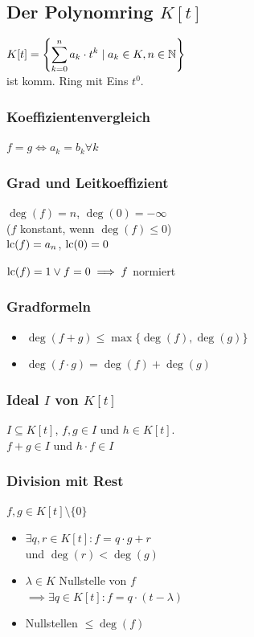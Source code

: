 \subsection*{Der Polynomring $K[t]$}
$\displaystyle K[t] = \left\{\sum_{k=0}^n a_k\cdot t^k \mid a_k \in K, n\in\mathbb{N} \right\}$ \\
ist komm. Ring mit Eins $t^0$.

\subsubsection*{Koeffizientenvergleich}
$f=g \iff a_k = b_k \forall k$

\subsubsection*{Grad und Leitkoeffizient}
$\deg(f)=n$, $\deg(0)=-\infty$ \\
($f$ konstant, wenn $\deg(f)\le0$) \\
$\operatorname{lc}(f)=a_n$, $\operatorname{lc}(0)=0$

$\operatorname{lc}(f)=1 \lor f=0 \implies f$ normiert

\subsubsection*{Gradformeln}
\begin{itemize}
	\item $\deg(f+g) \le \max\{\deg(f),\deg(g)\}$
	\item $\deg(f\cdot g) = \deg(f)+\deg(g)$
\end{itemize}

\subsubsection*{Ideal $I$ von $K[t]$}
$I\subseteq K[t]$, $f,g\in I$ und $h\in K[t]$. \\
$f+g \in I$ und $h \cdot f \in I$

\subsubsection*{Division mit Rest}
$f,g \in K[t]\setminus\{0\}$
\begin{itemize}
	\item $\exists q,r \in K[t]: f=q\cdot g + r$ \\
		und $\deg(r) < \deg(g)$
	\item $\lambda\in K$ Nullstelle von $f$\\
		$\implies\exists q\in K[t]: f=q\cdot(t-\lambda)$
	\item Nullstellen $\le \deg(f)$
\end{itemize}

